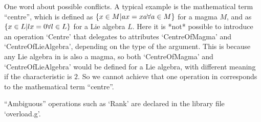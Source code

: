 One word about possible conflicts.
A typical example is the mathematical term ``centre'',
which is defined as $\{ x \in M | a \* x = x \* a \forall a \in M \}$
for a magma $M$, and as $\{ x \in L | l \* x = 0 \forall l \in L \}$
for a Lie algebra $L$.
Here it is *not* possible to introduce an operation `Centre' that
delegates to attributes `CentreOfMagma' and `CentreOfLieAlgebra',
depending on the type of the argument.
This is because any Lie algebra in {\GAP} is also a magma,
so both `CentreOfMagma' and `CentreOfLieAlgebra' would be defined
for a Lie algebra, with different meaning if the characteristic is $2$.
So we cannot achieve that one operation in {\GAP} corresponds to
the mathematical term ``centre''.

``Ambiguous'' operations such as `Rank' are declared in the library file
`overload.g'.



